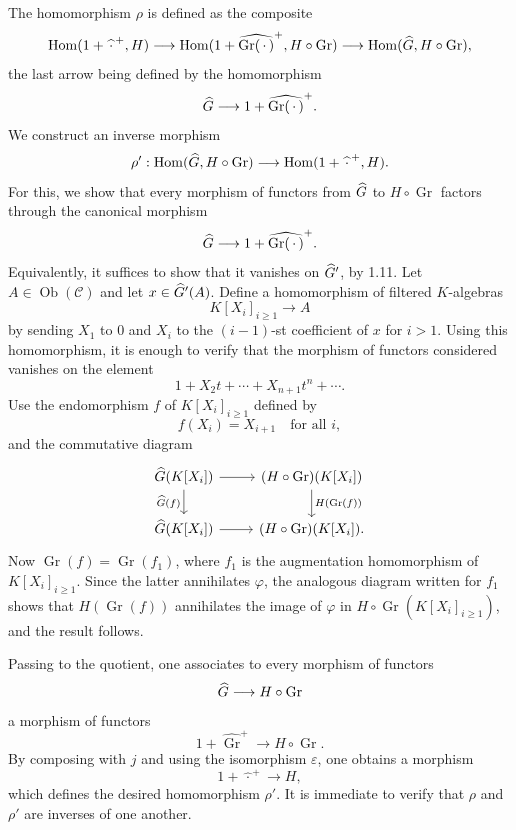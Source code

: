 \documentclass[11pt]{article}
\begin{document}
The homomorphism \(\rho\) is defined as the composite
\[
 \operatorname{Hom}(1+\widehat{\,\cdot\,}^{+},H)
 \longrightarrow
 \operatorname{Hom}(1+\widehat{\operatorname{Gr}(\,\cdot\,)}^{+},H\circ\operatorname{Gr})
 \longrightarrow
 \operatorname{Hom}(\widehat G,H\circ\operatorname{Gr}),
\]
the last arrow being defined by the homomorphism
\[
  \widehat G\longrightarrow 1+\widehat{\operatorname{Gr}(\,\cdot\,)}^{+}.
\]
We construct an inverse morphism
\[
  \rho':\operatorname{Hom}(\widehat G,H\circ\operatorname{Gr})
  \longrightarrow
  \operatorname{Hom}(1+\widehat{\,\cdot\,}^{+},H).
\]
For this, we show that every morphism of functors from \(\widehat G\) to \(H\circ\operatorname{Gr}\) factors through the canonical morphism
\[
  \widehat G\longrightarrow 1+\widehat{\operatorname{Gr}(\,\cdot\,)}^{+}.
\]
Equivalently, it suffices to show that it vanishes on \(\widehat G'\), by 1.11. Let \(A\in\operatorname{Ob}(\mathcal C)\) and let \(x\in\widehat G'(A)\). Define a homomorphism of filtered \(K\)-algebras
\[
  K[X_i]_{i\geq 1}\longrightarrow A
\]
by sending \(X_1\) to \(0\) and \(X_i\) to the \((i-1)\)-st coefficient of \(x\) for \(i>1\). Using this homomorphism, it is enough to verify that the morphism of functors considered vanishes on the element
\[
  1+X_2t+\cdots+X_{n+1}t^n+\cdots .
\]
Use the endomorphism \(f\) of \(K[X_i]_{i\geq 1}\) defined by
\[
  f(X_i)=X_{i+1}\quad\text{for all }i,
\]
and the commutative diagram
\[
\begin{tikzcd}
\Ghat(K[X_i]) \arrow[r] \arrow[d,"\Ghat(f)"'] &
(H\circ\operatorname{Gr})(K[X_i]) \arrow[d,"H(\operatorname{Gr}(f))"]\\
\Ghat(K[X_i]) \arrow[r] &
(H\circ\operatorname{Gr})(K[X_i]).
\end{tikzcd}
\]
Now \(\operatorname{Gr}(f)=\operatorname{Gr}(f_1)\), where \(f_1\) is the augmentation homomorphism of \(K[X_i]_{i\geq 1}\). Since the latter annihilates \(\varphi\), the analogous diagram written for \(f_1\) shows that \(H(\operatorname{Gr}(f))\) annihilates the image of \(\varphi\) in \(H\circ\operatorname{Gr}(K[X_i]_{i\geq 1})\), and the result follows.

Passing to the quotient, one associates to every morphism of functors
\[
  \widehat G\longrightarrow H\circ\operatorname{Gr}
\]
a morphism of functors
\[
  1+\widehat{\operatorname{Gr}}^{+}\longrightarrow H\circ\operatorname{Gr}.
\]
By composing with \(j\) and using the isomorphism \(\varepsilon\), one obtains a morphism
\[
  1+\widehat{\,\cdot\,}^{+}\longrightarrow H,
\]
which defines the desired homomorphism \(\rho'\). It is immediate to verify that \(\rho\) and \(\rho'\) are inverses of one another.
\end{document}
